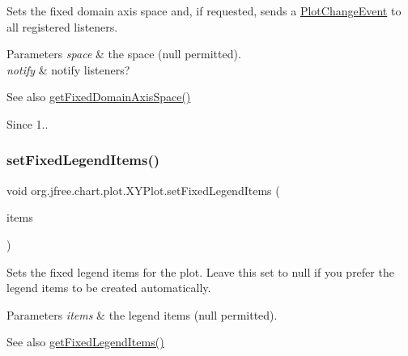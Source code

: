 Sets the fixed domain axis space and, if requested, sends a \mbox{\hyperlink{}{Plot\+Change\+Event}} to all registered listeners.


\begin{DoxyParams}{Parameters}
{\em space} & the space ({\ttfamily null} permitted). \\
\hline
{\em notify} & notify listeners?\\
\hline
\end{DoxyParams}
\begin{DoxySeeAlso}{See also}
\mbox{\hyperlink{classorg_1_1jfree_1_1chart_1_1plot_1_1_x_y_plot_addf279078b32787b75a4562fb61734be}{get\+Fixed\+Domain\+Axis\+Space()}}
\end{DoxySeeAlso}
\begin{DoxySince}{Since}
1.. 
\end{DoxySince}
\mbox{\label{classorg_1_1jfree_1_1chart_1_1plot_1_1_x_y_plot_a2cf1eedb574018155003b6a411fe691c}} 
\subsubsection{\texorpdfstring{set\+Fixed\+Legend\+Items()}{setFixedLegendItems()}}
{\footnotesize\ttfamily void org.\+jfree.\+chart.\+plot.\+X\+Y\+Plot.\+set\+Fixed\+Legend\+Items (\begin{DoxyParamCaption}\item[{\mbox{\hyperlink{classorg_1_1jfree_1_1chart_1_1_legend_item_collection}{Legend\+Item\+Collection}}}]{items }\end{DoxyParamCaption})}

Sets the fixed legend items for the plot. Leave this set to {\ttfamily null} if you prefer the legend items to be created automatically.


\begin{DoxyParams}{Parameters}
{\em items} & the legend items ({\ttfamily null} permitted).\\
\hline
\end{DoxyParams}
\begin{DoxySeeAlso}{See also}
\mbox{\hyperlink{classorg_1_1jfree_1_1chart_1_1plot_1_1_x_y_plot_aef746e72a753b6205a56c53b219cf9c2}{get\+Fixed\+Legend\+Items()}} 
\end{DoxySeeAlso}
\mbox{\label{classorg_1_1jfree_1_1chart_1_1plot_1_1_x_y_plot_a911cdf973fd36671c538cf41d42a0741}} 
